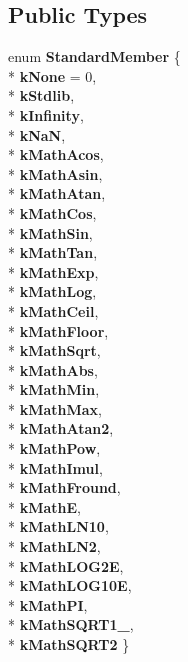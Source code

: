 \subsection*{Public Types}
\begin{DoxyCompactItemize}
\item 
enum {\bfseries Standard\+Member} \{ \\*
{\bfseries k\+None} = 0, 
\\*
{\bfseries k\+Stdlib}, 
\\*
{\bfseries k\+Infinity}, 
\\*
{\bfseries k\+NaN}, 
\\*
{\bfseries k\+Math\+Acos}, 
\\*
{\bfseries k\+Math\+Asin}, 
\\*
{\bfseries k\+Math\+Atan}, 
\\*
{\bfseries k\+Math\+Cos}, 
\\*
{\bfseries k\+Math\+Sin}, 
\\*
{\bfseries k\+Math\+Tan}, 
\\*
{\bfseries k\+Math\+Exp}, 
\\*
{\bfseries k\+Math\+Log}, 
\\*
{\bfseries k\+Math\+Ceil}, 
\\*
{\bfseries k\+Math\+Floor}, 
\\*
{\bfseries k\+Math\+Sqrt}, 
\\*
{\bfseries k\+Math\+Abs}, 
\\*
{\bfseries k\+Math\+Min}, 
\\*
{\bfseries k\+Math\+Max}, 
\\*
{\bfseries k\+Math\+Atan2}, 
\\*
{\bfseries k\+Math\+Pow}, 
\\*
{\bfseries k\+Math\+Imul}, 
\\*
{\bfseries k\+Math\+Fround}, 
\\*
{\bfseries k\+MathE}, 
\\*
{\bfseries k\+Math\+L\+N10}, 
\\*
{\bfseries k\+Math\+L\+N2}, 
\\*
{\bfseries k\+Math\+L\+O\+G2E}, 
\\*
{\bfseries k\+Math\+L\+O\+G10E}, 
\\*
{\bfseries k\+Math\+PI}, 
\\*
{\bfseries k\+Math\+S\+Q\+R\+T1\+\_}, 
\\*
{\bfseries k\+Math\+S\+Q\+R\+T2}
 \}\hypertarget{classv8_1_1internal_1_1_asm_typer_aeac2bb83472c2463c498e43faa7e9ed3}{}\label{classv8_1_1internal_1_1_asm_typer_aeac2bb83472c2463c498e43faa7e9ed3}

\end{DoxyCompactItemize}
